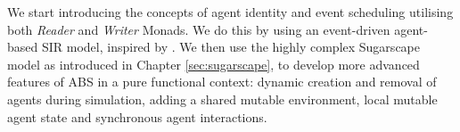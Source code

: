 \medskip

We start introducing the concepts of agent identity and event scheduling utilising both \textit{Reader} and \textit{Writer} Monads. We do this by using an event-driven agent-based SIR model, inspired by \cite{macal_agent-based_2010}. We then use the highly complex Sugarscape model as introduced in Chapter \ref{sec:sugarscape}, to develop more advanced features of ABS in a pure functional context: dynamic creation and removal of agents during simulation, adding a shared mutable environment, local mutable agent state and synchronous agent interactions. 





%

%

